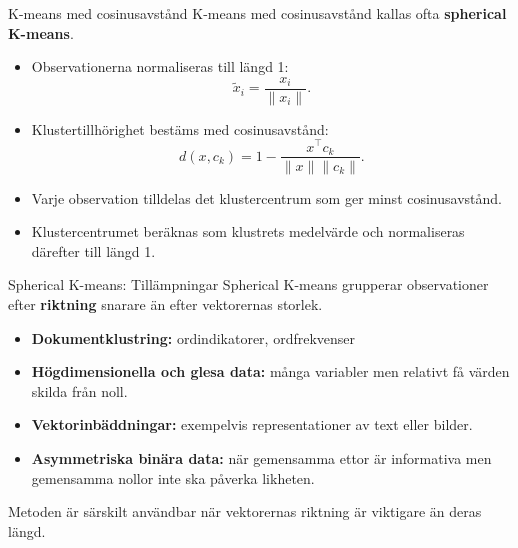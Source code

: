 \documentclass[10pt,english]{beamer}
\begin{document}
\begin{frame}{K-means med cosinusavstånd}
    K-means med cosinusavstånd kallas ofta
    \textbf{spherical K-means}.

    \begin{itemize}
        \item Observationerna normaliseras till längd 1:
        \[
            \widetilde{x}_i
            =
            \frac{x_i}{\lVert x_i\rVert}.
        \]

        \item Klustertillhörighet bestäms med cosinusavstånd:
        \[
            d(x,c_k)
            =
            1-
            \frac{x^\top c_k}
                 {\lVert x\rVert\lVert c_k\rVert}.
        \]

        \item Varje observation tilldelas det klustercentrum som
              ger minst cosinusavstånd.

        \item Klustercentrumet beräknas som klustrets medelvärde
              och normaliseras därefter till längd 1.
    \end{itemize}
\end{frame}

\begin{frame}{Spherical K-means: Tillämpningar}
    Spherical K-means grupperar observationer efter
    \textbf{riktning} snarare än efter vektorernas storlek.

    \begin{itemize}
        \item \textbf{Dokumentklustring:}
              ordindikatorer, ordfrekvenser

        \item \textbf{Högdimensionella och glesa data:}
              många variabler men relativt få värden skilda från noll.

        \item \textbf{Vektorinbäddningar:}
              exempelvis representationer av text eller bilder.

        \item \textbf{Asymmetriska binära data:}
              när gemensamma ettor är informativa men gemensamma
              nollor inte ska påverka likheten.
    \end{itemize}

    \begin{greenbox}
        Metoden är särskilt användbar när vektorernas riktning är
        viktigare än deras längd.
    \end{greenbox}
\end{frame}
\end{document}
